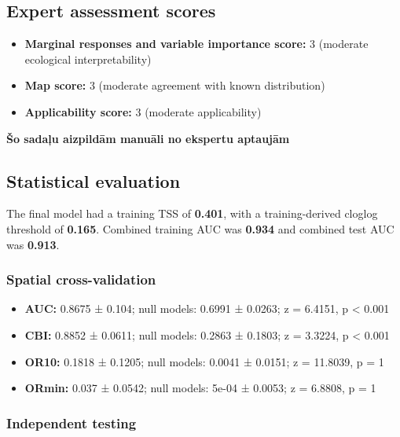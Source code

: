 \documentclass[
  openany]{book}
\providecommand{\tightlist}{%
  \setlength{\itemsep}{0pt}\setlength{\parskip}{0pt}}
\providecommand{\tightlist}{%
  \setlength{\itemsep}{0pt}%
  \setlength{\parskip}{0pt}%
}
\begin{document}
\subsection*{Expert assessment scores}\label{expert-assessment-scores-13}

\begin{itemize}
\tightlist
\item
  \textbf{Marginal responses and variable importance score:} 3 (moderate ecological interpretability)
\item
  \textbf{Map score:} 3 (moderate agreement with known distribution)
\item
  \textbf{Applicability score:} 3 (moderate applicability)
\end{itemize}

\textbf{Šo sadaļu aizpildām manuāli no ekspertu aptaujām}

\subsection*{Statistical evaluation}\label{statistical-evaluation-13}

The final model had a training TSS of \textbf{0.401}, with a training-derived cloglog threshold of \textbf{0.165}. Combined training AUC was \textbf{0.934} and combined test AUC was \textbf{0.913}.

\subsubsection*{Spatial cross-validation}\label{spatial-cross-validation-13}

\begin{itemize}
\tightlist
\item
  \textbf{AUC:} 0.8675 ± 0.104; null models: 0.6991 ± 0.0263; z = 6.4151, p \textless{} 0.001
\item
  \textbf{CBI:} 0.8852 ± 0.0611; null models: 0.2863 ± 0.1803; z = 3.3224, p \textless{} 0.001
\item
  \textbf{OR10:} 0.1818 ± 0.1205; null models: 0.0041 ± 0.0151; z = 11.8039, p = 1
\item
  \textbf{ORmin:} 0.037 ± 0.0542; null models: 5e-04 ± 0.0053; z = 6.8808, p = 1
\end{itemize}

\subsubsection*{Independent testing}\label{independent-testing-13}
\end{document}
